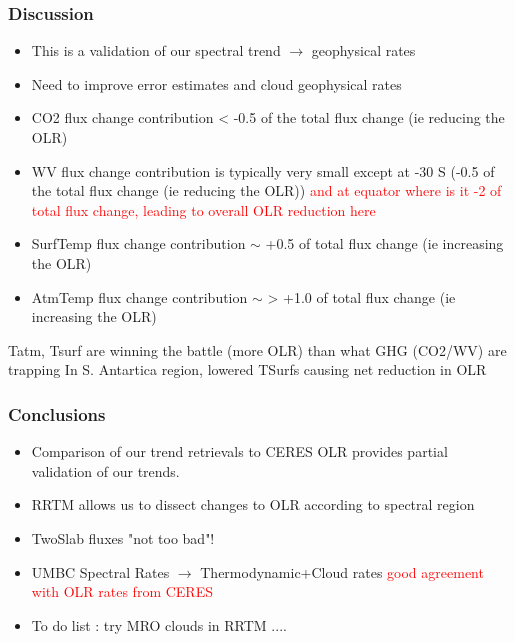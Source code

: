 \documentclass[10pt,t]{beamer}
\begin{document}
\begin{frame}
  \frametitle{Discussion}
  \begin{itemize}
    \item This is a validation of our spectral trend $\rightarrow$ geophysical rates
    \item Need to improve error estimates and cloud geophysical rates
    \item CO2 flux change contribution < -0.5 of the total flux change (ie reducing the OLR)
    \item WV  flux change contribution is typically very small except at -30 S (-0.5 of the total flux change (ie reducing the OLR))
          \textcolor{red}{and at equator where is it -2 of total flux change, leading to overall OLR reduction here}
    \item SurfTemp flux change contribution $\sim$ +0.5 of total flux change (ie increasing the OLR)
    \item AtmTemp  flux change contribution $\sim$ > +1.0 of total flux change (ie increasing the OLR)            
  \end{itemize}
  Tatm, Tsurf are winning the battle (more OLR) than what GHG (CO2/WV) are trapping \newline
  In S. Antartica region, lowered TSurfs causing net reduction in OLR
  \end{frame}

\begin{frame}
  \frametitle{Conclusions}
  \begin{itemize}
  \item Comparison of our trend retrievals to CERES OLR provides partial validation of our trends.
  \item RRTM allows us to dissect changes to OLR according to spectral region
    \item TwoSlab fluxes "not too bad"!
  \item UMBC Spectral Rates $\rightarrow$ Thermodynamic+Cloud rates \textcolor{red}{good agreement
        with OLR rates from CERES}
  \item To do list : try MRO clouds in RRTM ....
  \end{itemize}
\end{frame}
\end{document}
